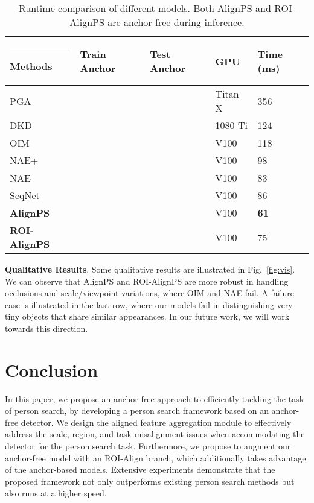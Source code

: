 \documentclass[journal]{IEEEtran}
\makeatletter
\newcommand{\thickhline}{\noalign {\ifnum 0=`}\fi \hrule height 1pt
    \futurelet \reserved@a \@xhline
}
\makeatother
\begin{document}
\begin{table}[t]
\small
\centering
\begin{tabular}{p{2cm}p{1cm}<{\centering}p{1cm}<{\centering}p{1cm}<{\centering}p{1.5cm}<{\centering}}
\hline\thickhline
\rowcolor{mygray} 
Methods &Train Anchor &Test Anchor & GPU  &  Time (ms)  \\  \hline \hline  
PGA~\cite{Kim_2021_CVPR} & &         &Titan X & 356 \\
DKD~\cite{DBLP:conf/aaai/ZhangWBSY21} & &        &1080 Ti & 124 \\
OIM \cite{DBLP:conf/cvpr/XiaoLWLW17} & && V100 & 118 \\
NAE+ \cite{DBLP:conf/cvpr/ChenZYS20} & & & V100 & 98 \\
NAE \cite{DBLP:conf/cvpr/ChenZYS20} & & & V100 & 83 \\
SeqNet \cite{DBLP:conf/aaai/LiM21} & & & V100 & 86 \\
\textbf{AlignPS} & & & V100 & \textbf{61} \\
\textbf{ROI-AlignPS} & &  & V100 & 75
\\\hline
\end{tabular}
\caption{Runtime comparison of different models. Both AlignPS and ROI-AlignPS are anchor-free during inference.}
\label{tab:runtime}
\vspace{-4mm}
\end{table}

\textbf{Qualitative Results}.
Some qualitative results are illustrated in Fig.~\ref{fig:vis}. We can observe that AlignPS and ROI-AlignPS are more robust in handling occlusions and scale/viewpoint variations, where OIM \cite{DBLP:conf/cvpr/XiaoLWLW17} and NAE \cite{DBLP:conf/cvpr/ChenZYS20} fail. A failure case is illustrated in the last row, where our models fail in distinguishing very tiny objects that share similar appearances. In our future work, we will work towards this direction.


\section{Conclusion}
In this paper, we propose an anchor-free approach to efficiently tackling the task of person search, by developing a person search framework based on an anchor-free detector. We design the aligned feature aggregation module to effectively address the scale, region, and task misalignment issues when accommodating the detector for the person search task. Furthermore, we propose to augment our anchor-free model with an ROI-Align branch, which additionally takes advantage of the anchor-based models. Extensive experiments demonstrate that the proposed framework not only outperforms existing person search methods but also runs at a higher speed.



{\small


}
\end{document}

